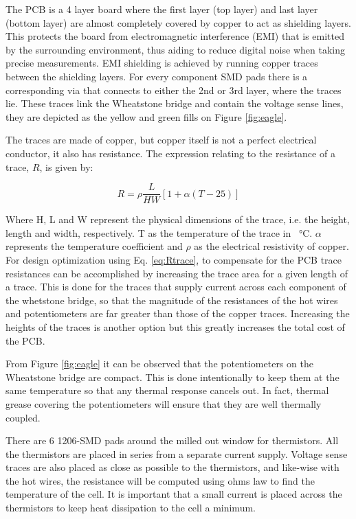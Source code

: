 \documentclass[12pt,MEng]{UoAThesis}
\begin{document}
The PCB is a 4 layer board where the first layer (top layer) and last layer (bottom layer) are almost completely covered by copper to act as shielding layers. This protects the board from electromagnetic interference (EMI) that is emitted by the surrounding environment, thus aiding to reduce digital noise when taking precise measurements. EMI shielding is achieved by running copper traces between the shielding layers. For every component SMD pads there is a corresponding via that connects to either the 2nd or 3rd layer, where the traces lie. These traces link the Wheatstone bridge and contain the voltage sense lines, they are depicted as the yellow and green fills on Figure \ref{fig:eagle}.

The traces are made of copper, but copper itself is not a perfect electrical conductor, it also has resistance. The expression \cite{pcb} relating to the resistance of a trace, $R$, is given by:

\begin{equation} \label{eq:Rtrace}
R = \rho \frac{L}{HW}\left[1 + \alpha \left( T - 25 \right) \right]
\end{equation}

\noindent Where H, L and W represent the physical dimensions of the trace, i.e. the height, length and width, respectively. T as the temperature of the trace in \SI{}{\celsius}. $\alpha$ represents the temperature coefficient and $\rho$ as the electrical resistivity of copper. For design optimization using Eq. \ref{eq:Rtrace}, to compensate for the PCB trace resistances can be accomplished by increasing the trace area for a given length of a trace. This is done for the traces that supply current across each component of the whetstone bridge, so that the magnitude of the resistances of the hot wires and potentiometers are far greater than those of the copper traces. Increasing the heights of the traces is another option but this greatly increases the total cost of the PCB. 

From Figure \ref{fig:eagle} it can be observed that the potentiometers on the Wheatstone bridge are compact. This is done intentionally to keep them at the same temperature so that any thermal response cancels out. In fact, thermal grease covering the potentiometers will ensure that they are well thermally coupled.

There are 6 1206-SMD pads around the milled out window for thermistors. All the thermistors are placed in series from a separate current supply. Voltage sense traces are also placed as close as possible to the thermistors, and like-wise with the hot wires, the resistance will be computed using ohms law to find the temperature of the cell. It is important that a small current is placed across the thermistors to keep heat dissipation to the cell a minimum. 
\end{document}
